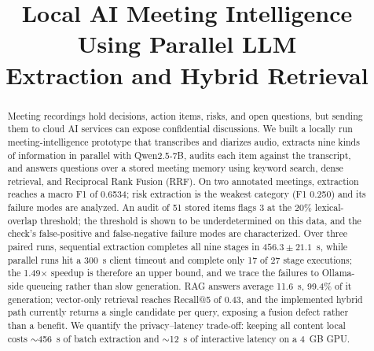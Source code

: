 \documentclass[conference]{IEEEtran}
\begin{document}
\title{Local AI Meeting Intelligence Using Parallel LLM\\ Extraction and Hybrid Retrieval}

\author{
\and
{}
}

\maketitle

\begin{abstract}
Meeting recordings hold decisions, action items, risks, and open questions, but sending them to cloud AI services can expose confidential discussions. We built a locally run meeting-intelligence prototype that transcribes and diarizes audio, extracts nine kinds of information in parallel with Qwen2.5-7B, audits each item against the transcript, and answers questions over a stored meeting memory using keyword search, dense retrieval, and Reciprocal Rank Fusion (RRF). On two annotated meetings, extraction reaches a macro F1 of 0.6534; risk extraction is the weakest category (F1 0.250) and its failure modes are analyzed. An audit of 51 stored items flags 3 at the 20\% lexical-overlap threshold; the threshold is shown to be underdetermined on this data, and the check's false-positive and false-negative failure modes are characterized. Over three paired runs, sequential extraction completes all nine stages in $456.3\pm21.1$~s, while parallel runs hit a 300~s client timeout and complete only 17 of 27 stage executions; the 1.49$\times$ speedup is therefore an upper bound, and we trace the failures to Ollama-side queueing rather than slow generation. RAG answers average 11.6~s, 99.4\% of it generation; vector-only retrieval reaches Recall@5 of 0.43, and the implemented hybrid path currently returns a single candidate per query, exposing a fusion defect rather than a benefit. We quantify the privacy--latency trade-off: keeping all content local costs $\sim$456~s of batch extraction and $\sim$12~s of interactive latency on a 4~GB GPU.
\end{abstract}
\end{document}
